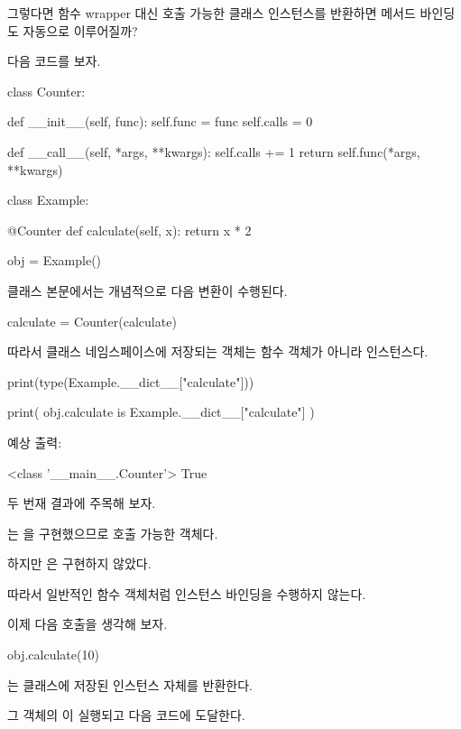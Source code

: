 그렇다면 함수 wrapper 대신 호출 가능한 클래스 인스턴스를 반환하면 메서드 바인딩도 자동으로 이루어질까?

다음 코드를 보자.

\begin{dhkcode}
class Counter:

    def __init__(self, func):
        self.func = func
        self.calls = 0

    def __call__(self, *args, **kwargs):
        self.calls += 1
        return self.func(*args, **kwargs)


class Example:

    @Counter
    def calculate(self, x):
        return x * 2


obj = Example()
\end{dhkcode}

클래스 본문에서는 개념적으로 다음 변환이 수행된다.

\begin{dhkcode}
calculate = Counter(calculate)
\end{dhkcode}

따라서 클래스 네임스페이스에 저장되는 객체는 함수 객체가 아니라  인스턴스다.

\begin{dhkcode}
print(type(Example.__dict__["calculate"]))

print(
    obj.calculate
    is Example.__dict__["calculate"]
)
\end{dhkcode}

예상 출력:

\begin{dhkzsh}
<class '__main__.Counter'>
True
\end{dhkzsh}

두 번재 결과에 주목해 보자.

는 을 구현했으므로 호출 가능한 객체다.

하지만 은 구현하지 않았다.

따라서 일반적인 함수 객체처럼 인스턴스 바인딩을 수행하지 않는다.

이제 다음 호출을 생각해 보자.

\begin{dhkcode}
obj.calculate(10)
\end{dhkcode}

는 클래스에 저장된  인스턴스 자체를 반환한다.

그 객체의 이 실행되고 다음 코드에 도달한다.

